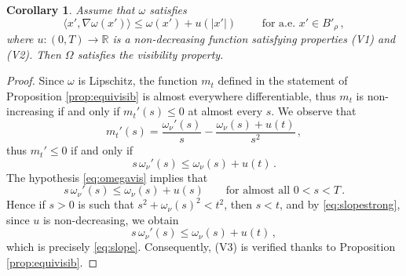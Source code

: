 \documentclass[a4paper,reqno,11pt]{amsart}
\newtheorem{corollary}[theorem]{Corollary}
\newcommand{\R}{\mathbb{R}}
\begin{document}
%
\begin{corollary} \label{cor:gradomega}
Assume that $\omega$ satisfies
\begin{equation} \label{eq:omegavis}
\langle x' , \nabla \omega (x') \rangle \leq \omega(x') + u(|x'|) \qquad \text{ for a.e. } x' \in B'_{\rho} \, ,
\end{equation}
where $u: (0,T) \rightarrow \R$ is a non-decreasing function satisfying properties (V1) and (V2). Then $\Omega$ satisfies the visibility property.
\end{corollary}
\begin{proof}
Since $\omega$ is Lipschitz, the function $m_{t}$ defined in the statement of Proposition \ref{prop:equivisib} is almost everywhere differentiable, thus $m_t$ is non-increasing if and only if $m_{t}'(s) \leq 0$ at almost every $s$. We observe that
\begin{equation*}
m_{t}'(s) = \dfrac{\omega_{\nu}'(s)}{s} - \dfrac{\omega_{\nu}(s) + u(t)}{s^{2}} \, ,
\end{equation*}
thus $m_{t}' \leq 0$ if and only if
\begin{equation} \label{eq:slope}
s \, \omega_{\nu}'(s) \leq \omega_{\nu}(s) + u(t) \, .
\end{equation}
The hypothesis \eqref{eq:omegavis} implies that %
\begin{equation} \label{eq:slopestrong}
s \, \omega_{\nu}'(s) \leq \omega_{\nu}(s) + u(s) \qquad \text{for almost all $0 < s < T \, .$}
\end{equation}
Hence if $s > 0$ is such that $s^2 + \omega_\nu(s)^2 < t^2$, then $s < t$, and by \eqref{eq:slopestrong}, since $u$ is non-decreasing, we obtain
\begin{equation*}
s \, \omega_{\nu}'(s) \leq \omega_{\nu}(s) + u(t) \, ,
\end{equation*}
which is precisely \eqref{eq:slope}. Consequently, (V3) is verified thanks to Proposition \ref{prop:equivisib}. 
\end{proof} 
	
\end{document}
